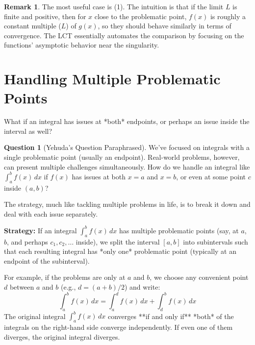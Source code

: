 \documentclass[11pt]{article}
\theoremstyle{definition}
\newtheorem{remark}[theorem]{Remark}
\newtheorem{question}[theorem]{Question} %
\newcommand{\dx}{\, dx} %
\begin{document}
\begin{remark}
    The most useful case is (1). The intuition is that if the limit $L$ is finite and positive, then for $x$ close to the problematic point, $f(x)$ is roughly a constant multiple ($L$) of $g(x)$, so they should behave similarly in terms of convergence. The LCT essentially automates the comparison by focusing on the functions' asymptotic behavior near the singularity.
\end{remark}

\section{Handling Multiple Problematic Points}

What if an integral has issues at *both* endpoints, or perhaps an issue inside the interval as well?

\begin{question}[Yehuda's Question Paraphrased]
    We've focused on integrals with a single problematic point (usually an endpoint). Real-world problems, however, can present multiple challenges simultaneously. How do we handle an integral like $\int_a^b f(x) \dx$ if $f(x)$ has issues at both $x=a$ and $x=b$, or even at some point $c$ inside $(a, b)$?
\end{question}

The strategy, much like tackling multiple problems in life, is to break it down and deal with each issue separately.

\textbf{Strategy:} If an integral $\int_a^b f(x) \dx$ has multiple problematic points (say, at $a$, $b$, and perhaps $c_1, c_2, \dots$ inside), we split the interval $[a, b]$ into subintervals such that each resulting integral has *only one* problematic point (typically at an endpoint of the subinterval).

For example, if the problems are only at $a$ and $b$, we choose any convenient point $d$ between $a$ and $b$ (e.g., $d = (a+b)/2$) and write:
\[
\int_a^b f(x) \dx = \int_a^d f(x) \dx + \int_d^b f(x) \dx
\]
The original integral $\int_a^b f(x) \dx$ converges **if and only if** *both* of the integrals on the right-hand side converge independently. If even one of them diverges, the original integral diverges.
\end{document}
